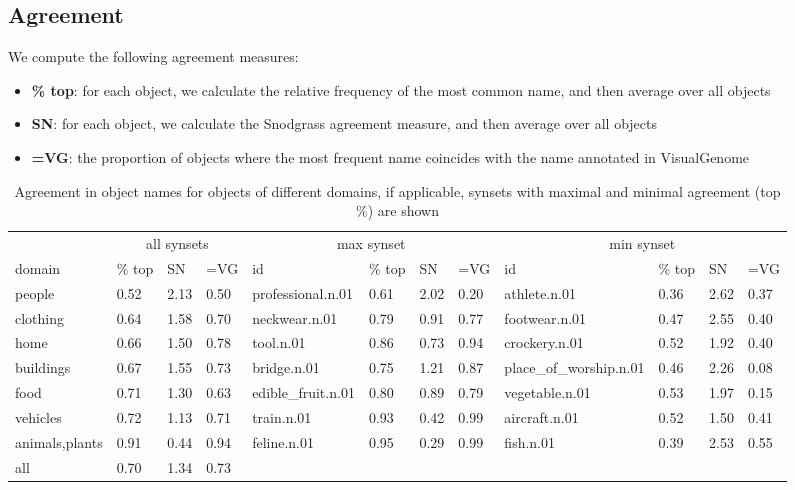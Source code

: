 \subsection{Agreement}

We compute the following agreement measures:

\begin{itemize}
\item \textbf{\% top}: for each object, we calculate the relative frequency of the most common name, and then average over all objects
\item \textbf{SN}: for each object, we calculate the Snodgrass agreement measure, and then average over all objects 
\item \textbf{=VG}: the proportion of objects where the most frequent name coincides with the name annotated in VisualGenome
\end{itemize}


\begin{table*}
\small
\begin{tabular}{llll|llll|llll}
\toprule
    & \multicolumn{3}{c|}{all synsets} & \multicolumn{4}{c|}{max synset} & \multicolumn{4}{c}{min synset} \\
                         domain & \% top &    SN &   =VG &         id &     \% top &    SN &   =VG &             id &     \% top &    SN &   =VG \\
\midrule
         people &  0.52 &  2.13 &  0.50 &  professional.n.01 &  0.61 &  2.02 &  0.20 &           athlete.n.01 &  0.36 &  2.62 &  0.37 \\
       clothing &  0.64 &  1.58 &  0.70 &      neckwear.n.01 &  0.79 &  0.91 &  0.77 &          footwear.n.01 &  0.47 &  2.55 &  0.40 \\
           home &  0.66 &  1.50 &  0.78 &          tool.n.01 &  0.86 &  0.73 &  0.94 &          crockery.n.01 &  0.52 &  1.92 &  0.40 \\
      buildings &  0.67 &  1.55 &  0.73 &        bridge.n.01 &  0.75 &  1.21 &  0.87 &  place\_of\_worship.n.01 &  0.46 &  2.26 &  0.08 \\
           food &  0.71 &  1.30 &  0.63 &  edible\_fruit.n.01 &  0.80 &  0.89 &  0.79 &         vegetable.n.01 &  0.53 &  1.97 &  0.15 \\
       vehicles &  0.72 &  1.13 &  0.71 &         train.n.01 &  0.93 &  0.42 &  0.99 &          aircraft.n.01 &  0.52 &  1.50 &  0.41 \\
 animals,plants &  0.91 &  0.44 &  0.94 &        feline.n.01 &  0.95 &  0.29 &  0.99 &              fish.n.01 &  0.39 &  2.53 &  0.55 \\
\bottomrule
 all &  0.70 &  1.34 &  0.73            \\

\bottomrule
\end{tabular}
\caption{Agreement in object names for objects of different domains, if applicable, synsets with maximal and minimal agreement (top \%) are shown }
\label{tab:agree}
\end{table*}

